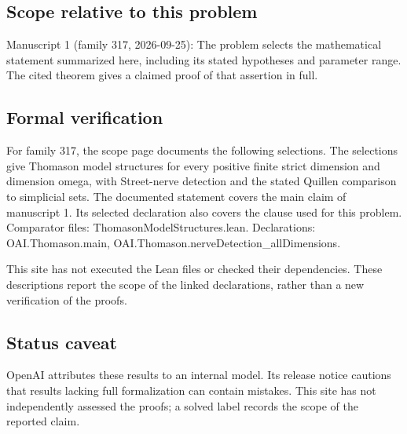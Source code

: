 \documentclass[11pt]{article}
\begin{document}
\subsection{Scope relative to this problem}
Manuscript 1 (family 317, 2026-09-25): The problem selects the mathematical statement summarized here, including its stated hypotheses and parameter range. The cited theorem gives a claimed proof of that assertion in full.

\subsection{Formal verification}
For family 317, the scope page documents the following selections. The selections give Thomason model structures for every positive finite strict dimension and dimension omega, with Street-nerve detection and the stated Quillen comparison to simplicial sets. The documented statement covers the main claim of manuscript 1. Its selected declaration also covers the clause used for this problem. Comparator files: ThomasonModelStructures.lean. Declarations: OAI.Thomason.main, OAI.Thomason.nerveDetection\_allDimensions.

This site has not executed the Lean files or checked their dependencies. These descriptions report the scope of the linked declarations, rather than a new verification of the proofs.

\subsection{Status caveat}
OpenAI attributes these results to an internal model. Its release notice cautions that results lacking full formalization can contain mistakes. This site has not independently assessed the proofs; a solved label records the scope of the reported claim.
\end{document}

